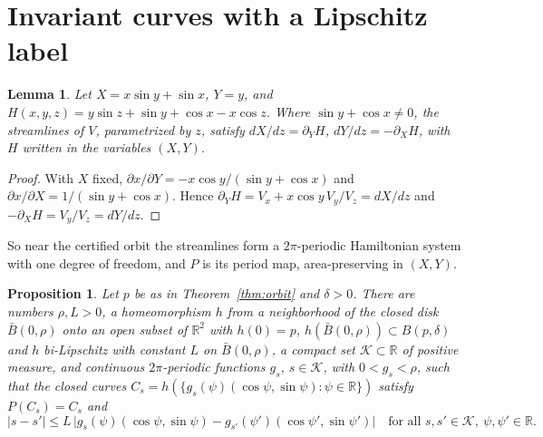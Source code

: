 \documentclass[11pt]{article}
\newtheorem{proposition}[theorem]{Proposition}
\newtheorem{lemma}[theorem]{Lemma}
\theoremstyle{definition}
\theoremstyle{remark}
\newcommand{\R}{\mathbb{R}}
\begin{document}
\section{Invariant curves with a Lipschitz label}\label{sec:kam}
\begin{lemma}\label{lem:ham}
Let $X=x\sin y+\sin x$, $Y=y$, and
$H(x,y,z)=y\sin z+\sin y+\cos x-x\cos z$. Where $\sin y+\cos x\ne0$, the
streamlines of $V$, parametrized by $z$, satisfy
$dX/dz=\partial_YH$, $dY/dz=-\partial_XH$, with $H$ written in the
variables $(X,Y)$.
\end{lemma}

\begin{proof}
With $X$ fixed, $\partial x/\partial Y=-x\cos y/(\sin y+\cos x)$ and
$\partial x/\partial X=1/(\sin y+\cos x)$. Hence
$\partial_YH=V_x+x\cos y\,V_y/V_z=dX/dz$ and
$-\partial_XH=V_y/V_z=dY/dz$.
\end{proof}

So near the certified orbit the streamlines form a $2\pi$-periodic
Hamiltonian system with one degree of freedom, and $P$ is its period map,
area-preserving in $(X,Y)$.

\begin{proposition}\label{prop:kam}
Let $p$ be as in Theorem~\ref{thm:orbit} and $\delta>0$. There are numbers
$\rho,L>0$, a homeomorphism $h$ from a neighborhood of the closed disk
$\bar B(0,\rho)$ onto an open subset of $\R^2$ with $h(0)=p$,
$h(\bar B(0,\rho))\subset B(p,\delta)$ and $h$ bi-Lipschitz with constant
$L$ on $\bar B(0,\rho)$, a compact set $\mathcal K\subset\R$ of positive
measure, and continuous $2\pi$-periodic functions $g_s$, $s\in\mathcal K$,
with $0<g_s<\rho$, such that the closed curves
$C_s=h(\{g_s(\psi)(\cos\psi,\sin\psi):\psi\in\R\})$ satisfy
$P(C_s)=C_s$ and
\[
|s-s'|\le L\,\bigl|g_s(\psi)(\cos\psi,\sin\psi)-g_{s'}(\psi')(\cos\psi',\sin\psi')\bigr|
\quad\text{for all } s,s'\in\mathcal K,\ \psi,\psi'\in\R.
\]
\end{proposition}
\end{document}
